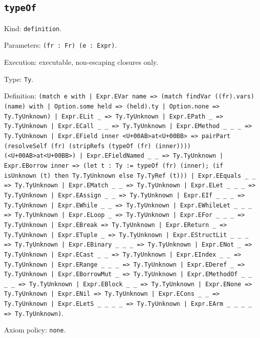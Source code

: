\documentclass[11pt]{article}
\begin{document}
\subsection*{\texttt{typeOf}}
\noindent Kind: \texttt{definition}.\par
\noindent Parameters: \texttt{(fr : Fr) (e : Expr)}.\par
\noindent Execution: executable, non-escaping closures only.\par
\noindent Type: \texttt{Ty}.\par
\noindent Definition: \texttt{(match e with | Expr.EVar name => (match findVar ((fr).vars) (name) with | Option.some held => (held).ty | Option.none => Ty.TyUnknown) | Expr.ELit \_ => Ty.TyUnknown | Expr.EPath \_ => Ty.TyUnknown | Expr.ECall \_ \_ => Ty.TyUnknown | Expr.EMethod \_ \_ \_ => Ty.TyUnknown | Expr.EField inner <U+00AB>at<U+00BB> => pairPart (resolveSelf (fr) (stripRefs (typeOf (fr) (inner)))) (<U+00AB>at<U+00BB>) | Expr.EFieldNamed \_ \_ => Ty.TyUnknown | Expr.EBorrow inner => (let t : Ty := typeOf (fr) (inner); (if isUnknown (t) then Ty.TyUnknown else Ty.TyRef (t))) | Expr.EEquals \_ \_ => Ty.TyUnknown | Expr.EMatch \_ \_ => Ty.TyUnknown | Expr.ELet \_ \_ \_ => Ty.TyUnknown | Expr.EAssign \_ \_ => Ty.TyUnknown | Expr.EIf \_ \_ \_ => Ty.TyUnknown | Expr.EWhile \_ \_ => Ty.TyUnknown | Expr.EWhileLet \_ \_ \_ => Ty.TyUnknown | Expr.ELoop \_ => Ty.TyUnknown | Expr.EFor \_ \_ \_ => Ty.TyUnknown | Expr.EBreak => Ty.TyUnknown | Expr.EReturn \_ => Ty.TyUnknown | Expr.ETuple \_ => Ty.TyUnknown | Expr.EStructLit \_ \_ \_ => Ty.TyUnknown | Expr.EBinary \_ \_ \_ => Ty.TyUnknown | Expr.ENot \_ => Ty.TyUnknown | Expr.ECast \_ \_ => Ty.TyUnknown | Expr.EIndex \_ \_ => Ty.TyUnknown | Expr.ERange \_ \_ \_ => Ty.TyUnknown | Expr.EDeref \_ => Ty.TyUnknown | Expr.EBorrowMut \_ => Ty.TyUnknown | Expr.EMethodOf \_ \_ \_ \_ => Ty.TyUnknown | Expr.EBlock \_ \_ => Ty.TyUnknown | Expr.ENone => Ty.TyUnknown | Expr.ENil => Ty.TyUnknown | Expr.ECons \_ \_ => Ty.TyUnknown | Expr.ELetS \_ \_ \_ \_ => Ty.TyUnknown | Expr.EArm \_ \_ \_ \_ => Ty.TyUnknown)}.\par
\noindent Axiom policy: \texttt{none}.\par
\end{document}
